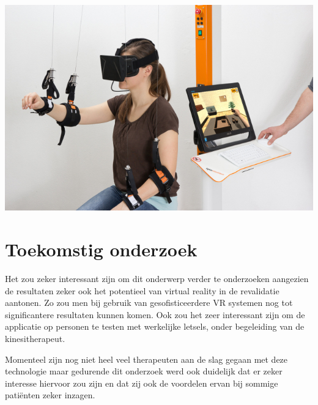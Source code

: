 \documentclass[a0,portrait]{a0poster}
\begin{document}
\begin{multicols}{2}
\begin{center}\vspace{1cm}
\includegraphics[width=0.8\linewidth]{poster1}
\end{center}\vspace{1cm}




\color{HoGentAccent1} 
\color{HoGentAccent1} 
\section*{Toekomstig onderzoek}
\color{black}

Het zou zeker interessant zijn om dit onderwerp verder te onderzoeken aangezien de resultaten
zeker ook het potentieel van virtual reality in de revalidatie aantonen. Zo zou men bij gebruik van
gesofisticeerdere VR systemen nog tot significantere resultaten kunnen komen. Ook zou het zeer interessant
zijn om de applicatie op personen te testen met werkelijke letsels, onder begeleiding van de
kinesitherapeut.

Momenteel zijn nog niet heel veel therapeuten aan de slag gegaan met deze technologie maar
gedurende dit onderzoek werd ook duidelijk dat er zeker interesse hiervoor zou zijn en dat zij ook
de voordelen ervan bij sommige patiënten zeker inzagen.


\end{multicols}
\end{document}

